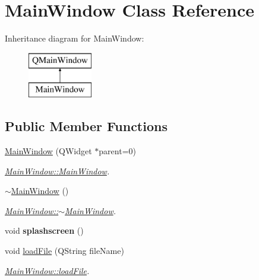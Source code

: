 \hypertarget{class_main_window}{}\section{Main\+Window Class Reference}
\label{class_main_window}
Inheritance diagram for Main\+Window\+:\begin{figure}[H]
\begin{center}
\leavevmode
\includegraphics[height=2.000000cm]{class_main_window}
\end{center}
\end{figure}
\subsection*{Public Member Functions}
\begin{DoxyCompactItemize}
\item 
\hyperlink{class_main_window_a8b244be8b7b7db1b08de2a2acb9409db}{Main\+Window} (Q\+Widget $\ast$parent=0)
\begin{DoxyCompactList}\small\item\em \hyperlink{class_main_window_a8b244be8b7b7db1b08de2a2acb9409db}{Main\+Window\+::\+Main\+Window}. \end{DoxyCompactList}\item 
\hyperlink{class_main_window_ae98d00a93bc118200eeef9f9bba1dba7}{$\sim$\+Main\+Window} ()
\begin{DoxyCompactList}\small\item\em \hyperlink{class_main_window_ae98d00a93bc118200eeef9f9bba1dba7}{Main\+Window\+::$\sim$\+Main\+Window}. \end{DoxyCompactList}\item 
void {\bfseries splashscreen} ()\hypertarget{class_main_window_a6d788add1549fb237ef3a9e8fa2bd394}{}\label{class_main_window_a6d788add1549fb237ef3a9e8fa2bd394}

\item 
void \hyperlink{class_main_window_a2e88bd3ea5604f4b4a4056ab4de369d4}{load\+File} (Q\+String file\+Name)
\begin{DoxyCompactList}\small\item\em \hyperlink{class_main_window_a2e88bd3ea5604f4b4a4056ab4de369d4}{Main\+Window\+::load\+File}. \end{DoxyCompactList}\end{DoxyCompactItemize}


